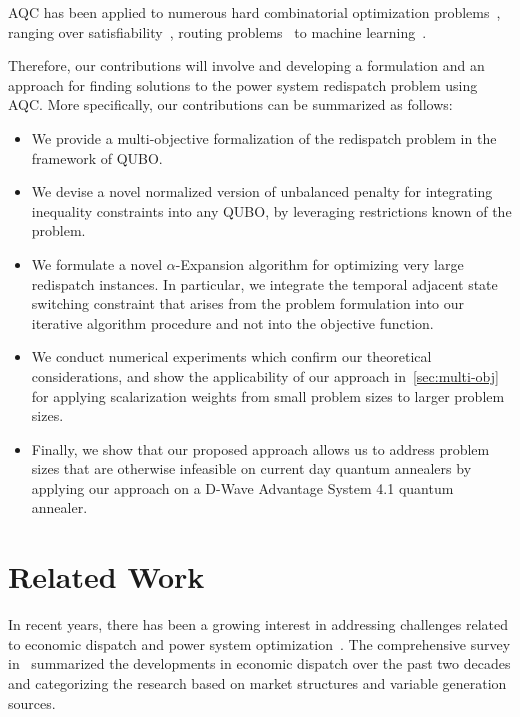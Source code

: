 \documentclass[conference]{IEEEtran}
\makeatletter
\newcommand{\QUBO}{\textsc{QUBO}\@\xspace}
\makeatother
\begin{document}
AQC has been applied to numerous hard combinatorial optimization problems~\cite{lucas2014}, ranging over satisfiability~\cite{kochenberger2005}, routing problems~\cite{neukart2017} to machine learning~\cite{bauckhage2019}.

Therefore, our contributions will involve and developing a formulation
and an approach for finding solutions to the power system redispatch
problem using AQC. More specifically, our contributions can be
summarized as follows:
\begin{itemize}
\item We provide a multi-objective formalization of the redispatch
  problem in the framework of {\QUBO}.
\item We devise a novel normalized version of unbalanced penalty for
  integrating inequality constraints into any {\QUBO}, by leveraging
  restrictions known of the problem.
\item We formulate a novel $\alpha$-Expansion algorithm for optimizing
  very large redispatch instances. In particular, we integrate the
  temporal adjacent state switching constraint that arises from
  the problem formulation into our iterative algorithm procedure and not
  into the objective
  function. %
\item We conduct numerical experiments which confirm our theoretical
  considerations, and show the applicability of our approach
  in~\cref{sec:multi-obj} for applying scalarization weights from small
  problem sizes to larger problem sizes.
\item Finally, we show that our proposed approach allows us to
  address problem sizes that are otherwise infeasible on current day
  quantum annealers by applying our approach on a D-Wave
  Advantage System 4.1 quantum annealer.
\end{itemize}

\section{Related Work}
In recent years, there has been a growing interest in addressing
challenges related to economic dispatch and power system
optimization~\cite{ajagekar2019energy}.  The comprehensive survey
in~\cite{ciornei2013recent} summarized the developments in economic
dispatch over the past two decades and categorizing the research based
on market structures and variable generation sources.
\end{document}

